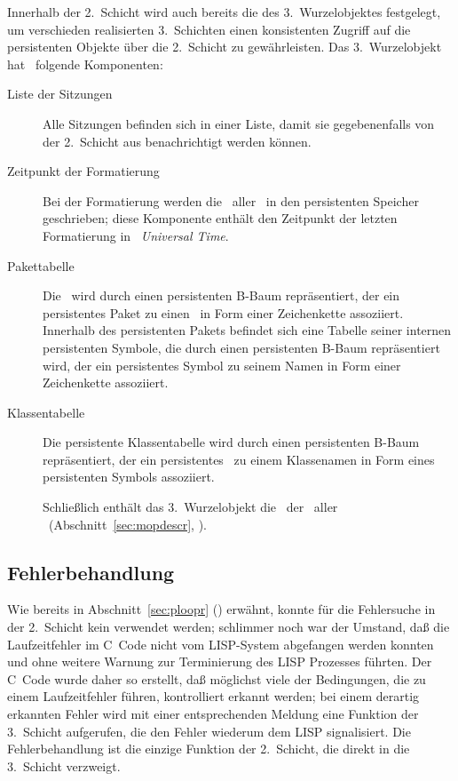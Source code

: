 %
Innerhalb der 2.~Schicht wird auch bereits die \representationform{}
des 3.~Wurzelobjektes festgelegt, um verschieden realisierten
3.~Schichten einen konsistenten Zugriff auf die persistenten Objekte
\"{u}ber die 2.~Schicht zu gew\"{a}hrleisten. Das 3.~Wurzelobjekt
hat \ua\ folgende Komponenten:
%
\begin{description}
%
\item[Liste der Sitzungen]
Alle Sitzungen befinden sich in einer Liste, damit sie gegebenenfalls
von der 2.~Schicht aus benachrichtigt werden k\"{o}n\-nen.
%
\item[Zeitpunkt der Formatierung]
Bei der Formatierung werden die \clsdo[e]\ aller \dec[n]\ in den
persistenten Speicher geschrieben; diese Komponente enth\"{a}lt den
Zeitpunkt der letzten Formatierung in \cl\ {\em Universal Time}.
%
\item[Pakettabelle]
Die \ wird durch einen persistenten
B-Baum re\-pr\"{a}\-sen\-tiert, der ein persistentes Paket zu einen
\ in Form einer Zeichenkette
assoziiert. Innerhalb des persistenten Pakets befindet sich eine
Tabelle seiner internen persistenten Symbole, die durch einen
persistenten B-Baum repr\"{a}sentiert wird, der ein persistentes Symbol
zu seinem Namen in Form einer Zeichenkette assoziiert.
%
\item[Klassentabelle]
Die persistente Klassentabelle wird durch einen persistenten B-Baum
re\-pr\"{a}\-sen\-tiert, der ein persistentes \clsdo\ zu einem
Klassenamen in Form eines persistenten Symbols assoziiert.
%
\item[{\deo[e]}]
Schlie\ss{}lich enth\"{a}lt das 3.~Wurzelobjekt die \objid[s]\ der
\clsdo[e]\ aller \dec[n]\ (Abschnitt~\ref{sec:mopdescr},
\citepage{\pageref{sec:mopdescr}}).
%
\end{description}
%
\subsection{Fehlerbehandlung}
%
Wie bereits in 
Abschnitt~\ref{sec:ploopr} (\citepage{\pageref{sec:ploopr}}) erw\"{a}hnt,
konnte f\"{u}r die Fehlersuche in
der 2.~Schicht kein \debugger\/ verwendet werden; schlimmer noch war
der Umstand, da\ss{} die Laufzeitfehler im C~Code nicht vom LISP-System
abgefangen werden konnten und ohne weitere Warnung zur Terminierung
des LISP Prozesses f\"{u}hrten. Der C~Code wurde daher so erstellt, da\ss{}
m\"{o}glichst viele der Bedingungen, die zu einem Laufzeitfehler f\"{u}hren,
kontrolliert erkannt werden; bei einem derartig erkannten Fehler wird
mit einer entsprechenden Meldung eine Funktion der 3.~Schicht
aufgerufen, die den Fehler wiederum dem LISP \debugger\/ signalisiert.
Die Fehlerbehandlung ist die einzige Funktion der 2.~Schicht, die
direkt in die 3.~Schicht verzweigt.
%
